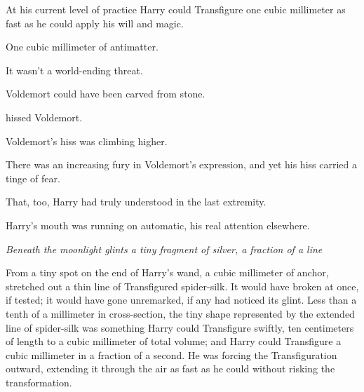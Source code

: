 At his current level of practice Harry could Transfigure one cubic millimeter
as fast as he could apply his will and magic.

One cubic millimeter of antimatter.

It wasn't a world-ending threat.

Voldemort could have been carved from stone. 


 hissed Voldemort. 


 Voldemort's hiss was climbing
higher.


There was an increasing fury in Voldemort's expression, and yet his hiss
carried a tinge of fear. 

 That, too, Harry had truly understood in the last extremity.

Harry's mouth was running on automatic, his real attention elsewhere.

\emph{Beneath the moonlight glints a tiny fragment of silver, a fraction of a
line{\el}}

From a tiny spot on the end of Harry's wand, a cubic millimeter of anchor,
stretched out a thin line of Transfigured spider-silk. It would have broken at
once, if tested; it would have gone unremarked, if any had noticed its glint.
Less than a tenth of a millimeter in cross-section, the tiny shape represented
by the extended line of spider-silk was something Harry could Transfigure
swiftly, ten centimeters of length to a cubic millimeter of total volume; and
Harry could Transfigure a cubic millimeter in a fraction of a second. He was
forcing the Transfiguration outward, extending it through the air as fast as he
could without risking the transformation.

